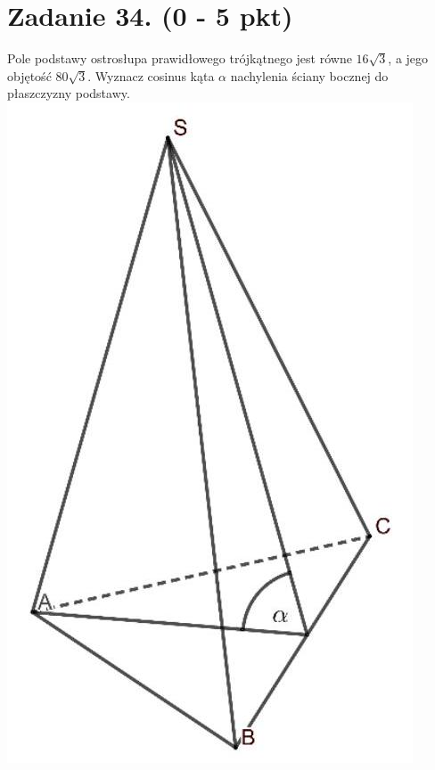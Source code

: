 \documentclass[10pt]{article}
\begin{document}
\section*{Zadanie 34. (0 - 5 pkt)}
Pole podstawy ostrosłupa prawidłowego trójkątnego jest równe \(16 \sqrt{3}\), a jego objętość \(80 \sqrt{3}\). Wyznacz cosinus kąta \(\alpha\) nachylenia ściany bocznej do płaszczyzny podstawy.\\
\includegraphics[max width=\textwidth, center]{2024_11_21_997c30e0b98e62837d84g-19}\\
\end{document}
